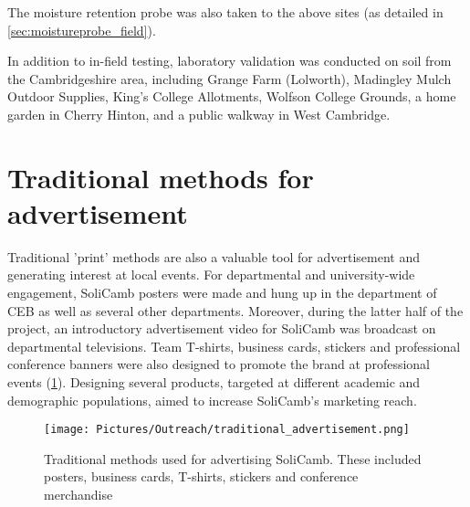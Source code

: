    The moisture retention probe was also taken to the above sites (as detailed in \cref{sec:moistureprobe_field}). 
   
   In addition to in-field testing, laboratory validation was conducted on soil from the Cambridgeshire area, including Grange Farm (Lolworth), Madingley Mulch Outdoor Supplies, King's College Allotments, Wolfson College Grounds,  a home garden in Cherry Hinton, and a public walkway in West Cambridge. 
   
   \section{Traditional methods for advertisement}
    Traditional 'print' methods are also a valuable tool for advertisement and generating interest at local events. For departmental and university-wide engagement, SoliCamb posters were made and hung up in the department of \gls{CEB} as well as several other departments. Moreover, during the latter half of the project, an introductory advertisement video for SoliCamb was broadcast on departmental televisions. Team T-shirts, business cards, stickers and professional conference banners were also designed to promote the brand at professional events (\cref{fig:traditional_advertisement}).  Designing several products, targeted at different academic and demographic populations, aimed to increase SoliCamb's marketing reach.
    
    \begin{figure}[ht]
    	\centering
    	\texttt{[image: Pictures/Outreach/traditional\_advertisement.png]}
    	\captionsetup{justification = centering}
    	\caption{ Traditional methods used for advertising SoliCamb. These included posters, business cards, T-shirts, stickers and conference merchandise }
    	\label{fig:traditional_advertisement}
     \end{figure}

